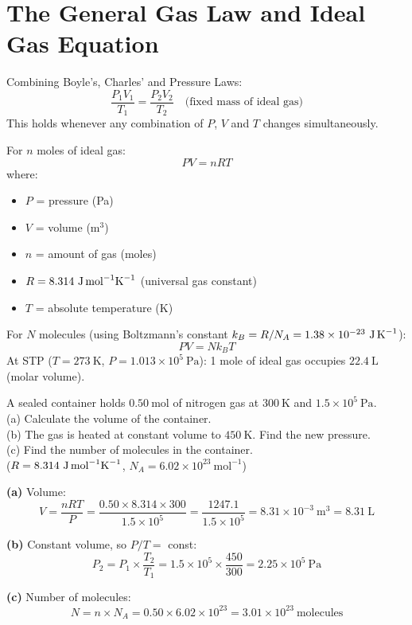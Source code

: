\section{The General Gas Law and Ideal Gas Equation}

\begin{lawbox}
Combining Boyle's, Charles' and Pressure Laws:
\[
  \boxed{\frac{P_1 V_1}{T_1} = \frac{P_2 V_2}{T_2}}
  \quad \text{(fixed mass of ideal gas)}
\]
This holds whenever any combination of $P$, $V$
and $T$ changes simultaneously.
\end{lawbox}

\begin{lawbox}
For $n$ moles of ideal gas:
\[
  \boxed{PV = nRT}
\]
where:
\begin{itemize}[noitemsep]
  \item $P$ = pressure (Pa)
  \item $V$ = volume (m$^3$)
  \item $n$ = amount of gas (moles)
  \item $R = 8.314\ \text{J\,mol}^{-1}\text{K}^{-1}$
  (universal gas constant)
  \item $T$ = absolute temperature (K)
\end{itemize}
For $N$ molecules (using Boltzmann's constant
$k_B = R/N_A = 1.38\times10^{-23}\ \text{J\,K}^{-1}$):
\[
  PV = Nk_BT
\]
At STP ($T = 273\ \text{K}$, $P = 1.013\times10^5\ \text{Pa}$):
1 mole of ideal gas occupies $22.4\ \text{L}$ (molar volume).
\end{lawbox}

\begin{examplebox}[14.4]
A sealed container holds $0.50\ \text{mol}$ of
nitrogen gas at $300\ \text{K}$ and
$1.5\times10^5\ \text{Pa}$.\\
(a) Calculate the volume of the container.\\
(b) The gas is heated at constant volume to
$450\ \text{K}$. Find the new pressure.\\
(c) Find the number of molecules in the container.\\
($R = 8.314\ \text{J\,mol}^{-1}\text{K}^{-1}$,
$N_A = 6.02\times10^{23}\ \text{mol}^{-1}$)
\end{examplebox}

\begin{solutionbox}
\textbf{(a)} Volume:
\[
  V = \frac{nRT}{P}
  = \frac{0.50 \times 8.314 \times 300}
    {1.5\times10^5}
  = \frac{1247.1}{1.5\times10^5}
  = 8.31\times10^{-3}\ \text{m}^3
  = 8.31\ \text{L}
\]

\textbf{(b)} Constant volume, so $P/T = $ const:
\[
  P_2 = P_1 \times \frac{T_2}{T_1}
  = 1.5\times10^5 \times \frac{450}{300}
  = 2.25\times10^5\ \text{Pa}
\]

\textbf{(c)} Number of molecules:
\[
  N = n \times N_A = 0.50 \times 6.02\times10^{23}
  = 3.01\times10^{23}\ \text{molecules}
\]
\end{solutionbox}

